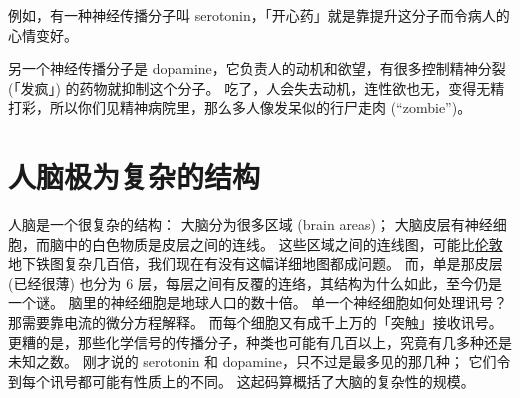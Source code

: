 \documentclass[12pt]{report}
\newcommand{\cc}[2]{#1}
\newcommand{\cc}[2]{#2}
\begin{document}
{\cc{
例如，有一种神经传播分子叫 serotonin，「开心药」就是靠提升这分子而令病人的心情变好。
}{
For example, there is a neurotransmitter known as \textbf{serotonin}.  Anti-depression drugs (eg. the well-known drug Prozac) raise its levels to cause people to feel happier.
}

\cc{
另一个神经传播分子是 dopamine，它负责人的动机和欲望，有很多控制精神分裂 (「发疯」) 的药物就抑制这个分子。 吃了，人会失去动机，连性欲也无，变得无精打彩，所以你们见精神病院里，那么多人像发呆似的行尸走肉 (``zombie'')。
}{
Another ``famous'' neurotransmitter is \textbf{dopamine}, which is responsible for \textit{motivations} and \textit{desires}.  Many drugs that claim to control schizophrenia work via suppressing this molecule.  When such drugs are taken, patients lose their motivations, even sex drive, and become lethargic (tired).  That's why in mental hospitals, we often see patients walking around looking like ``zombies''.
}

\section{\cc{人脑极为复杂的结构}{The brain's structure is extremely complicated}}

\cc{
人脑是一个很复杂的结构： 大脑分为很多区域 (brain areas)； 大脑皮层有神经细胞，而脑中的白色物质是皮层之间的连线。 这些区域之间的连线图，可能比\uline{伦敦}地下铁图复杂几百倍，我们现在有没有这幅详细地图都成问题。 而，单是那皮层 (已经很薄) 也分为 6 层，每层之间有反覆的连络，其结构为什么如此，至今仍是一个谜。 脑里的神经细胞是地球人口的数十倍。 单一个神经细胞如何处理讯号？ 那需要靠电流的微分方程解释。 而每个细胞又有成千上万的「突触」接收讯号。 更糟的是，那些化学信号的传播分子，种类也可能有几百以上，究竟有几多种还是未知之数。 刚才说的 serotonin 和 dopamine，只不过是最多见的那几种； 它们令到每个讯号都可能有性质上的不同。 这起码算概括了大脑的复杂性的规模。
}{
The human brain is an \textbf{immensely complicated} structure:  The cortex can be divided into many \textbf{brain areas};  the cortex consists of layers of neurons, and the ``white matter'' is the connecting fibre among neurons.  The connectivity map of these areas may be 100s of times more complicated than the London subway map, and we currently don't have such a complete map.  Moreover, the cortical layer itself has a 6-layer structure with ``recurrent'' (loop-forming) connections among layers.  Neuroscientists are still struggling to explain this recurrent structure.  The number of neurons in the brain is 10s times the human population on earth.  A single neuron's information processing is described by a differential equation.  And each neuron recieves signals from 1000s-10,000s of synapses.  Even worse, there are 100s of varieties of neurotransmitters, and we still have not exhausted that list.  The serotonin and dopamine I mentioned just then, are only the most common ones.  They \textit{modulate} the electrical signals in subtle ways, that neuroscientists have barely begun to theorize.  This about summarizes how complicated the brain is.
}

}
\end{document}
